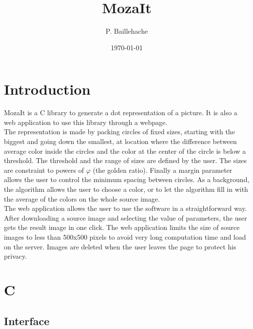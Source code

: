 \documentclass[12pt, a4paper]{article}
\begin{document}
\title{MozaIt}
\author{P. Baillehache}
\date{\today}
\maketitle

\tableofcontents

\section*{Introduction}

MozaIt is a C library to generate a dot representation of a picture. It is also a web application to use this library through a webpage.\\

The representation is made by packing circles of fixed sizes, starting with the biggest and going down the smallest, at location where the difference between average color inside the circles and the color at the center of the circle is below a threshold. The threshold and the range of sizes are defined by the user. The sizes are constraint to powers of $\varphi$ (the golden ratio). Finally a margin parameter allows the user to control the minimum spacing between circles. As a background, the algorithm allows the user to choose a color, or to let the algorithm fill in with the average of the colors on the whole source image.\\

The web application allows the user to use the software in a straightforward way. After downloading a source image and selecting the value of parameters, the user gets the result image in one click. The web application limits the size of source images to less than 500x500 pixels to avoid very long computation time and load on the server. Images are deleted when the user leaves the page to protect his privacy.\\

\section{C}

\subsection{Interface}
\end{document}
